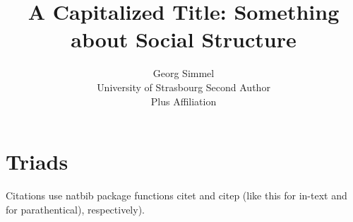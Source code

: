 \documentclass[article]{sa}
\author{Georg Simmel\\University of Strasbourg \And 
        Second Author\\Plus Affiliation}
\title{A Capitalized Title: Something about Social Structure}
\begin{document}

\section{Triads}
Citations use natbib package functions citet and citep (like this for in-text \citet{simmel1903mml} and \citep{simmel1903mml} for parathentical), respectively). 

\end{document}
